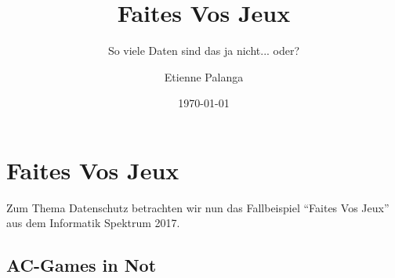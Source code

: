 \documentclass[11pt, a4paper]{scrartcl}
\title{Faites Vos Jeux}
\subtitle{So viele Daten sind das ja nicht... oder?}
\author{Etienne Palanga}
\date{\today}
\begin{document}
\maketitle

\tableofcontents




\section{Faites Vos Jeux}

Zum Thema Datenschutz betrachten wir nun das Fallbeispiel \enquote{Faites Vos Jeux}\cite{kees_faites_2017} aus dem Informatik Spektrum 2017.

\subsection{AC-Games in Not}
\end{document}

